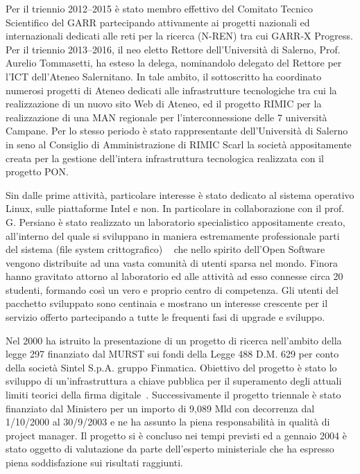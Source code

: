 \documentclass[11pt,a4paper,sans]{moderncv}        %
\newcommand{\lastYear}{\em 2022}
\begin{document}
{
Per il triennio 2012--2015 è stato membro effettivo del Comitato Tecnico Scientifico del GARR partecipando attivamente ai progetti nazionali ed internazionali dedicati alle reti per la ricerca (N-REN) tra cui GARR-X Progress.}
{
Per il triennio 2013--2016, il neo eletto Rettore dell’Università di Salerno, Prof. Aurelio Tommasetti, ha esteso la delega, nominandolo delegato del Rettore per l’ICT dell’Ateneo Salernitano.
In tale ambito, il sottoscritto ha coordinato numerosi progetti di Ateneo dedicati alle infrastrutture tecnologiche tra cui la realizzazione di un nuovo sito Web di Ateneo, ed il progetto RIMIC per la realizzazione di una MAN regionale per l’interconnessione delle 7 università Campane. Per lo stesso periodo è stato rappresentante dell'Università di Salerno in seno al Consiglio di Amministrazione di RIMIC Scarl la società appositamente creata per la gestione dell’intera infrastruttura tecnologica realizzata con il progetto PON.
}

\cventry{1996--\lastYear}{Laboratorio Specialistico Linux/TCFS e Sicurezza}{}{}{}
{
Sin dalle prime attività, particolare interesse è stato dedicato al sistema operativo Linux, sulle piattaforme Intel e non. In particolare in collaborazione con il prof. G. Persiano è stato realizzato un laboratorio specialistico appositamente creato, all'interno del quale si sviluppano in maniera estremamente professionale parti del sistema (file system crittografico) ~\cite{USENIX:01} che nello spirito dell’Open Software vengono distribuite ad una vasta comunità di utenti sparsa nel mondo. Finora hanno gravitato attorno al laboratorio ed alle attività ad esso connesse circa 20 studenti, formando così un vero e proprio centro di competenza. Gli utenti del pacchetto sviluppato sono centinaia e mostrano un interesse crescente per il servizio offerto partecipando a tutte le frequenti fasi di upgrade e sviluppo.
}

{
Nel 2000 ha istruito la presentazione di un progetto di ricerca nell’ambito della legge 297  finanziato dal MURST sui fondi della Legge 488 D.M. 629 per conto della società Sintel S.p.A. gruppo Finmatica. Obiettivo del progetto è stato lo sviluppo di un’infrastruttura a chiave pubblica per il superamento degli attuali limiti teorici della firma digitale~\cite{AICA:01}.
Successivamente il progetto triennale è stato finanziato dal Ministero per un importo di 9,089 Mld con decorrenza dal 1/10/2000 al 30/9/2003 e ne ha assunto la piena responsabilità in qualità di project manager. Il progetto si è concluso nei tempi previsti ed a gennaio 2004 è stato oggetto di valutazione da parte dell’esperto ministeriale che ha espresso piena soddisfazione sui risultati raggiunti.
}
\end{document}
